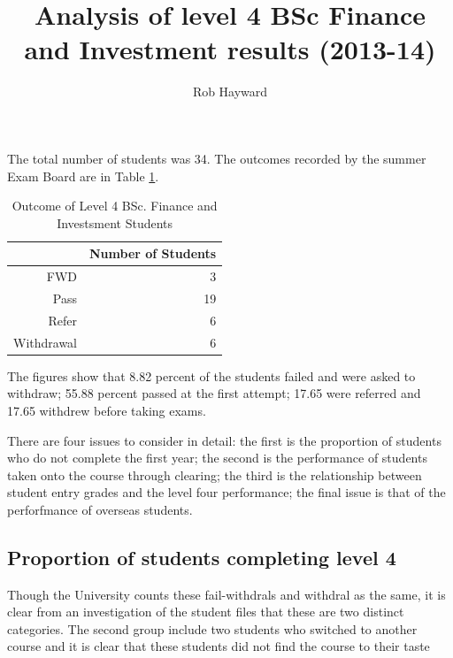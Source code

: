 \documentclass[12pt, a4paper, oneside]{article}\usepackage[]{graphicx}\usepackage[]{color}
\begin{document}
\title{Analysis of level 4 BSc Finance and Investment results (2013-14)}
\author{Rob Hayward}
\maketitle

The total number of students was 34.  The outcomes recorded by the summer Exam Board are in Table \ref{tabref:out}.  

\begin{table}[ht]
\centering
\begin{tabular}{rr}
  \hline
 & Number of Students \\ 
  \hline
FWD &   3 \\ 
  Pass &  19 \\ 
  Refer &   6 \\ 
  Withdrawal &   6 \\ 
   \hline
\end{tabular}
\caption{Outcome of Level 4 BSc. Finance and Investsment Students} 
\label{tabref:out}
\end{table}

The figures show that 8.82 percent of the students failed and were asked to withdraw;  55.88 percent passed at the first attempt; 17.65 were referred and 17.65 withdrew before taking exams.  

There are four issues to consider in detail: the first is the proportion of students who do not complete the first year; the second is the performance of students taken onto the course through clearing; the third is the relationship between student entry grades and the level four performance; the final issue is that of the perforfmance of overseas students. 

\subsection*{Proportion of students completing level 4}

Though the University counts these fail-withdrals and withdral as the same, it is clear from an investigation of the student files that these are two distinct categories.  The second group include two students who switched to another course and it is clear that these students did not find the course to their taste 
\end{document}
